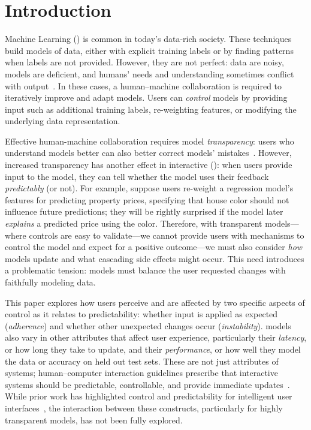 \section{Introduction}

Machine Learning () is common in today's data-rich society.
These techniques build models of data, either with explicit training
labels or by finding patterns when labels are not provided.
However, they are not perfect: data are noisy, models are
deficient, and humans' needs and understanding sometimes conflict with
 output~\cite{amodei2016concrete}.
In these cases, a human--machine collaboration is required to iteratively improve and adapt models.
Users can \textit{control} models by providing input such as additional training labels, re-weighting features, or modifying the underlying data representation.


Effective human-machine collaboration requires model
\textit{transparency}: users who understand models better can also
better correct models'
mistakes~\cite{Kulesza2010ExplanatoryPrograms,
  Rosenthal2010TowardsData}.
However, increased transparency has another effect in interactive 
(): when users provide input to the model, they can tell whether the model uses their feedback
\textit{predictably} (or not).
For example, suppose users re-weight a regression model's features
for predicting property prices, specifying that house color should
not influence future predictions; they will be rightly
surprised if the model later \textit{explains} a predicted price using
the color.
Therefore, with transparent models---where controls are easy to validate---we cannot  provide
users with mechanisms to control the model and expect for a positive
outcome---we must also consider \textit{how} models update and what
cascading side effects might occur. This need introduces a problematic
tension:
 models must balance the user requested changes with faithfully modeling
 data.

This paper explores how users perceive and are affected by two specific aspects of control as it relates to predictability: whether input is applied as expected (\textit{adherence}) and whether other unexpected changes occur (\textit{instability}).  models also vary in other attributes that affect user experience, particularly their \textit{latency}, or how long they take to update, and their \textit{performance}, or how well they model the data or accuracy on held out test sets. These are not just attributes of  systems; human--computer interaction guidelines prescribe that interactive systems should be predictable, controllable, and provide immediate updates~\cite{Hoekman2007DesigningDesign, Shneiderman1996TheVisualizations}. While prior work has highlighted control and predictability for intelligent user interfaces~\cite{Hook2000StepsReal}, the interaction between these constructs, particularly for highly transparent models, has not been fully explored.

